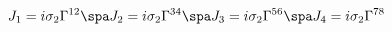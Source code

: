 \begin{equation}
J_1 = i \sigma_2 \Gamma^{12} \spa
J_2 = i \sigma_2 \Gamma^{34} \spa
J_3 = i \sigma_2 \Gamma^{56} \spa
J_4 = i \sigma_2 \Gamma^{78}
\end{equation}

